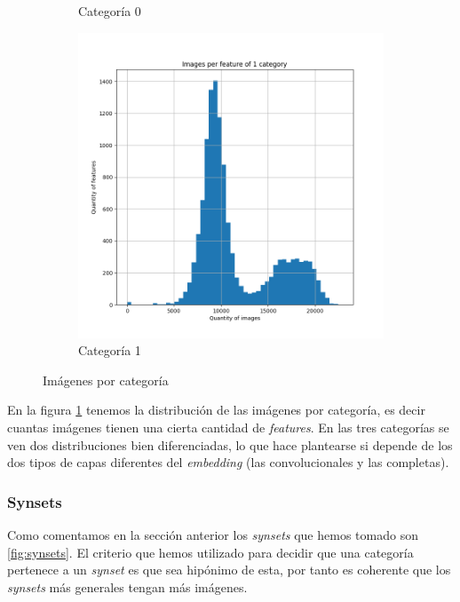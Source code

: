 \documentclass[12,twoside]{TFG-GM}
\theoremstyle{definition}
\theoremstyle{remark}
\begin{document}
\begin{figure}[ht]
\begin{subfigure}[b]{0.3\textwidth}
		\caption{Categoría 0}
	\end{subfigure}
	\begin{subfigure}[b]{0.3\textwidth}
		\includegraphics[width=\textwidth]  {Images/plots/25/Images_per_feature_of_1_category.png}
		\caption{Categoría 1}
	\end{subfigure}       
	\caption{Imágenes por categoría \label{fig:imagesperfeature}}
\end{figure}

En la figura \ref{fig:imagesperfeature} tenemos la distribución de las imágenes por categoría, es decir cuantas imágenes tienen una cierta cantidad de \textit{features}. En las tres categorías se ven dos distribuciones bien diferenciadas, lo que hace plantearse si depende de los dos tipos de capas diferentes del \textit{embedding} (las convolucionales y las completas).

\subsubsection{Synsets}

Como comentamos en la sección anterior los \textit{synsets} que hemos tomado son \ref{fig:synsets}. 
El criterio que hemos utilizado para decidir que una categoría pertenece a un \textit{synset} es que sea hipónimo de esta, por tanto es coherente que los \textit{synsets} más generales tengan más imágenes. 
 
\end{document}
